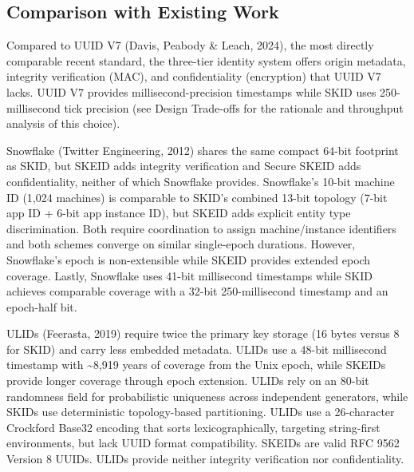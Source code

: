 \documentclass[fleqn,10pt]{wlpeerj}
\begin{document}
\subsection{Comparison with Existing
Work}\label{comparison-with-existing-work}

Compared to UUID V7 (Davis, Peabody \& Leach, 2024), the most directly
comparable recent standard, the three-tier identity system offers origin
metadata, integrity verification (MAC), and confidentiality (encryption)
that UUID V7 lacks. UUID V7 provides millisecond-precision timestamps
while SKID uses 250-millisecond tick precision (see Design Trade-offs
for the rationale and throughput analysis of this choice).

Snowflake (Twitter Engineering, 2012) shares the same compact 64-bit
footprint as SKID, but SKEID adds integrity verification and Secure
SKEID adds confidentiality, neither of which Snowflake provides.
Snowflake's 10-bit machine ID (1,024 machines) is comparable to SKID's
combined 13-bit topology (7-bit app ID + 6-bit app instance ID), but
SKEID adds explicit entity type discrimination. Both require
coordination to assign machine/instance identifiers and both schemes
converge on similar single-epoch durations. However, Snowflake's epoch
is non-extensible while SKEID provides extended epoch coverage. Lastly,
Snowflake uses 41-bit millisecond timestamps while SKID achieves
comparable coverage with a 32-bit 250-millisecond timestamp and an
epoch-half bit.

ULIDs (Feerasta, 2019) require twice the primary key storage (16 bytes
versus 8 for SKID) and carry less embedded metadata. ULIDs use a 48-bit
millisecond timestamp with \textasciitilde8,919 years of coverage from
the Unix epoch, while SKEIDs provide longer coverage through epoch
extension. ULIDs rely on an 80-bit randomness field for probabilistic
uniqueness across independent generators, while SKIDs use deterministic
topology-based partitioning. ULIDs use a 26-character Crockford Base32
encoding that sorts lexicographically, targeting string-first
environments, but lack UUID format compatibility. SKEIDs are valid RFC
9562 Version 8 UUIDs. ULIDs provide neither integrity verification nor
confidentiality.
\end{document}
